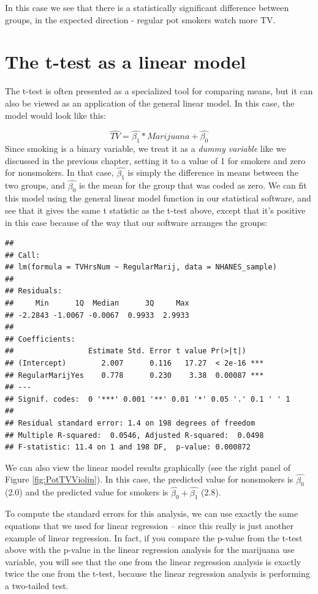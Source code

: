 \documentclass[12pt,]{book}
\theoremstyle{definition}
\theoremstyle{definition}
\theoremstyle{definition}
\theoremstyle{remark}
\begin{document}
In this case we see that there is a statistically significant difference between groups, in the expected direction - regular pot smokers watch more TV.

\hypertarget{ttest-linear-model}{%
\section{The t-test as a linear model}\label{ttest-linear-model}}

The t-test is often presented as a specialized tool for comparing means, but it can also be viewed as an application of the general linear model. In this case, the model would look like this:

\[
\hat{TV} = \hat{\beta_1}*Marijuana + \hat{\beta_0}
\]
Since smoking is a binary variable, we treat it as a \emph{dummy variable} like we discussed in the previous chapter, setting it to a value of 1 for smokers and zero for nonsmokers. In that case, \(\hat{\beta_1}\) is simply the difference in means between the two groups, and \(\hat{\beta_0}\) is the mean for the group that was coded as zero. We can fit this model using the general linear model function in our statistical software, and see that it gives the same t statistic as the t-test above, except that it's positive in this case because of the way that our software arranges the groups:

\begin{verbatim}
## 
## Call:
## lm(formula = TVHrsNum ~ RegularMarij, data = NHANES_sample)
## 
## Residuals:
##     Min      1Q  Median      3Q     Max 
## -2.2843 -1.0067 -0.0067  0.9933  2.9933 
## 
## Coefficients:
##                 Estimate Std. Error t value Pr(>|t|)    
## (Intercept)        2.007      0.116   17.27  < 2e-16 ***
## RegularMarijYes    0.778      0.230    3.38  0.00087 ***
## ---
## Signif. codes:  0 '***' 0.001 '**' 0.01 '*' 0.05 '.' 0.1 ' ' 1
## 
## Residual standard error: 1.4 on 198 degrees of freedom
## Multiple R-squared:  0.0546, Adjusted R-squared:  0.0498 
## F-statistic: 11.4 on 1 and 198 DF,  p-value: 0.000872
\end{verbatim}

We can also view the linear model results graphically (see the right panel of Figure \ref{fig:PotTVViolin}). In this case, the predicted value for nonsmokers is \(\hat{\beta_0}\) (2.0) and the predicted value for smokers is \(\hat{\beta_0} +\hat{\beta_1}\) (2.8).

To compute the standard errors for this analysis, we can use exactly the same equations that we used for linear regression -- since this really is just another example of linear regression. In fact, if you compare the p-value from the t-test above with the p-value in the linear regression analysis for the marijuana use variable, you will see that the one from the linear regression analysis is exactly twice the one from the t-test, because the linear regression analysis is performing a two-tailed test.
\end{document}
